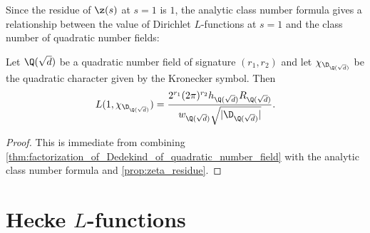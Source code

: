       Since the residue of $\z(s)$ at $s = 1$ is $1$, the analytic class number formula gives a relationship between the value of Dirichlet $L$-functions at $s = 1$ and the class number of quadratic number fields:

      \begin{corollary}
        Let $\Q(\sqrt{d})$ be a quadratic number field of signature $(r_{1},r_{2})$ and let $\chi_{\D_{\Q(\sqrt{d})}}$ be the quadratic character given by the Kronecker symbol. Then
        \[
          L(1,\chi_{\D_{\Q(\sqrt{d})}}) = \frac{2^{r_{1}}(2\pi)^{r_{2}}h_{\Q(\sqrt{d})}R_{\Q(\sqrt{d})}}{w_{\Q(\sqrt{d})}\sqrt{|\D_{\Q(\sqrt{d})}|}}.
        \]
      \end{corollary}
      \begin{proof}
        This is immediate from combining \cref{thm:factorization_of_Dedekind_of_quadratic_number_field} with the analytic class number formula and \cref{prop:zeta_residue}.
      \end{proof}
  \section{Hecke \texorpdfstring{$L$}{L}-functions}
